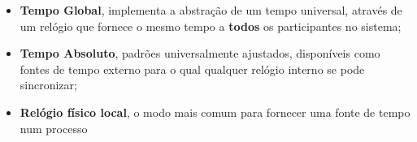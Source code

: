 \documentclass{article}
\begin{document}
\begin{itemize}
	\item \textbf{Tempo Global}, implementa a abstração de um tempo universal, através de um relógio que fornece o mesmo tempo a \textbf{todos} os participantes no sistema;
	\item \textbf{Tempo Absoluto}, padrões universalmente ajustados, disponíveis como fontes de tempo externo para o qual qualquer relógio interno se pode sincronizar;
	\item \textbf{Relógio físico local}, o modo mais comum para fornecer uma fonte de tempo num processo
\end{itemize}
\end{document}
